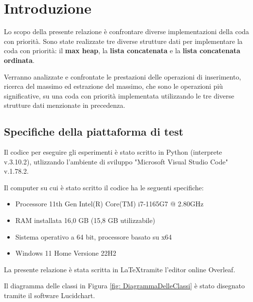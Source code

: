 \documentclass{article}
\begin{document}
\titleformat{\section}[hang]{\normalfont\Large\bfseries}{\thesection}{1em}{\raggedright}
\titleformat{\subsection}[hang]{\normalfont\large\bfseries}{\thesubsection}{1em}{\raggedright}

\section{Introduzione}
Lo scopo della presente relazione è confrontare diverse implementazioni della coda con priorità. Sono state realizzate tre diverse strutture dati per implementare la coda con priorità: il \textbf{max heap}, la \textbf{lista concatenata} e la \textbf{lista concatenata ordinata}.

Verranno analizzate e confrontate le prestazioni delle operazioni di inserimento, ricerca del massimo ed estrazione del massimo, che sono le operazioni più significative, su una coda con priorità implementata utilizzando le tre diverse strutture dati menzionate in precedenza.

\subsection{Specifiche della piattaforma di test}
Il codice per eseguire gli esperimenti è stato scritto in Python (interprete v.3.10.2), utlizzando l'ambiente di sviluppo "Microsoft Visual Studio Code" v.1.78.2. 

Il computer su cui è stato scritto il codice ha le seguenti specifiche:

\begin{itemize}
  \item Processore 11th Gen Intel(R) Core(TM) i7-1165G7 @ 2.80GHz
  \item RAM installata 16,0 GB (15,8 GB utilizzabile)
  \item Sistema operativo a 64 bit, processore basato su x64
  \item Windows 11 Home Versione	22H2
\end{itemize}

La presente relazione è stata scritta in \LaTeX tramite l'editor online Overleaf.

Il diagramma delle classi in Figura \ref{fig: DiagrammaDelleClassi} è stato disegnato tramite il software Lucidchart.
\end{document}
